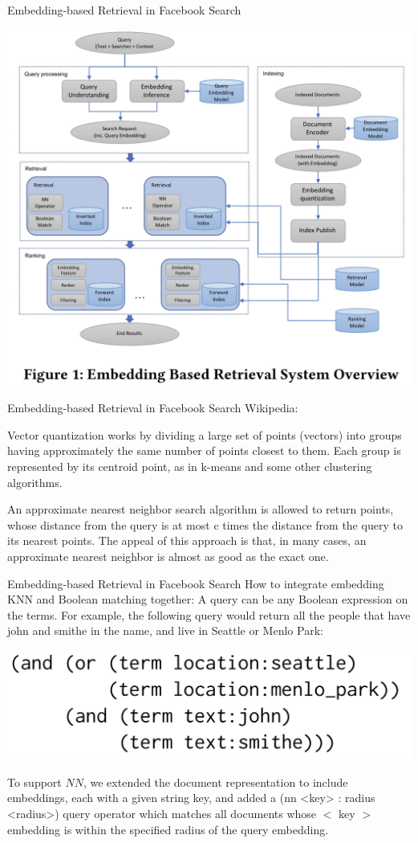 \documentclass{beamer}
\begin{document}
\begin{frame}{Embedding-based Retrieval in Facebook Search}
    \begin{center}
        \includegraphics[width=0.7\linewidth]{Retrieval1.png}
    \end{center}
\end{frame}

\begin{frame}{Embedding-based Retrieval in Facebook Search}
    Wikipedia:

    Vector quantization works by dividing a large set of points (vectors) into groups having approximately the same number of points closest to them. Each group is represented by its centroid point, as in k-means and some other clustering algorithms.

    An approximate nearest neighbor search algorithm is allowed to return points, whose distance from the query is at most c times the distance from the query to its nearest points. The appeal of this approach is that, in many cases, an approximate nearest neighbor is almost as good as the exact one.

\end{frame}

\begin{frame}{Embedding-based Retrieval in Facebook Search}
How to integrate embedding KNN and Boolean matching together:
 A query can be any Boolean expression on the terms. For example, the following query would return all the people that have john and smithe in the name, and live in Seattle or Menlo Park:

    \includegraphics[width=0.7\linewidth]{Retrieval2.png}

To support $NN$, we extended the document representation to include embeddings, each with a given string key, and added a (nn <key> : radius <radius>) query operator which matches all documents whose $<$ key $>$ embedding is within the specified radius of the query embedding.

\end{frame}
\end{document}
